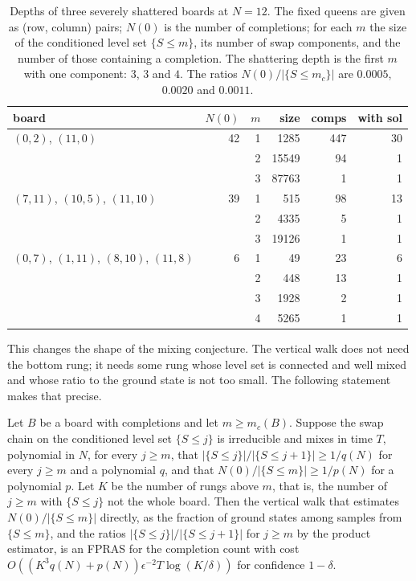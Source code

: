 \begin{table}[t]
\centering
\small
\caption{Depths of three severely shattered boards at $N = 12$. The fixed queens are given as (row, column) pairs; $N(0)$ is the number of completions; for each $m$ the size of the conditioned level set $\{ S \le m \}$, its number of swap components, and the number of those containing a completion. The shattering depth is the first $m$ with one component: $3$, $3$ and $4$. The ratios $N(0) / |\{ S \le m_c \}|$ are $0.0005$, $0.0020$ and $0.0011$.}
\label{tab:depth}
\footnotesize
\begin{tabular}{p{3.2cm}rrrrr}
\toprule
board & $N(0)$ & $m$ & size & comps & with sol \\
\midrule
$(0,2)$, $(11,0)$ & 42 & 1 & 1285 & 447 & 30 \\
 & & 2 & 15549 & 94 & 1 \\
 & & 3 & 87763 & 1 & 1 \\
\midrule
$(7,11)$, $(10,5)$, $(11,10)$ & 39 & 1 & 515 & 98 & 13 \\
 & & 2 & 4335 & 5 & 1 \\
 & & 3 & 19126 & 1 & 1 \\
\midrule
$(0,7)$, $(1,11)$, $(8,10)$, $(11,8)$ & 6 & 1 & 49 & 23 & 6 \\
 & & 2 & 448 & 13 & 1 \\
 & & 3 & 1928 & 2 & 1 \\
 & & 4 & 5265 & 1 & 1 \\
\bottomrule
\end{tabular}
\end{table}

This changes the shape of the mixing conjecture. The vertical walk does not need the bottom rung; it needs some rung whose level set is connected and well mixed and whose ratio to the ground state is not too small. The following statement makes that precise.

\begin{theorem}
\label{thm:rungskip}
Let $B$ be a board with completions and let $m \ge m_c(B)$. Suppose the swap chain on the conditioned level set $\{ S \le j \}$ is irreducible and mixes in time $T$, polynomial in $N$, for every $j \ge m$, that $|\{ S \le j \}| / |\{ S \le j + 1 \}| \ge 1 / q(N)$ for every $j \ge m$ and a polynomial $q$, and that $N(0) / |\{ S \le m \}| \ge 1 / p(N)$ for a polynomial $p$. Let $K$ be the number of rungs above $m$, that is, the number of $j \ge m$ with $\{ S \le j \}$ not the whole board. Then the vertical walk that estimates $N(0) / |\{ S \le m \}|$ directly, as the fraction of ground states among samples from $\{ S \le m \}$, and the ratios $|\{ S \le j \}| / |\{ S \le j + 1 \}|$ for $j \ge m$ by the product estimator, is an FPRAS for the completion count with cost $O((K^3 q(N) + p(N)) \epsilon^{-2} T \log (K/\delta))$ for confidence $1 - \delta$.
\end{theorem}

